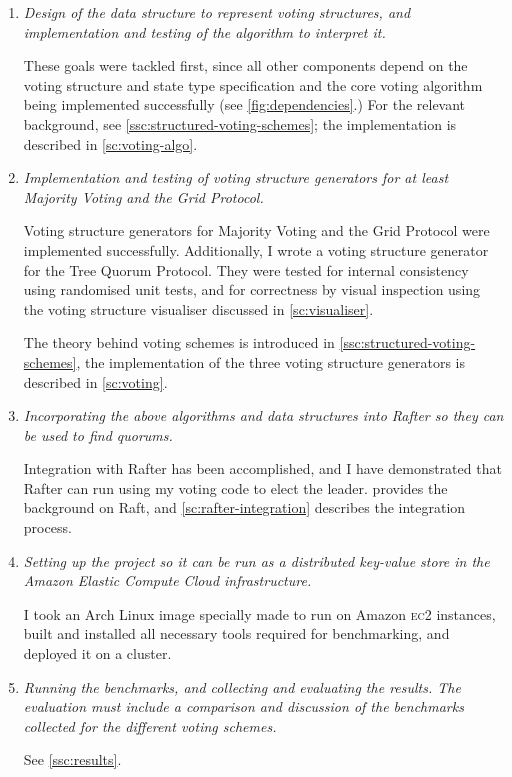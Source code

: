 \documentclass[12pt,chapterprefix=true,toc=bibliography,numbers=noendperiod,
               footnotes=multiple,twoside]{scrreprt}
\newcommand{\ECC}[0]{\textsc{ec}2 }
\begin{document}
\begin{enumerate}
    \item \emph{Design of the data structure to represent voting structures, and implementation and testing of the algorithm to interpret it.}

        These goals were tackled first, since all other components depend on the voting structure and state type specification and the core voting algorithm being implemented successfully (see \cref{fig:dependencies}.) For the relevant background, see \cref{ssc:structured-voting-schemes}; the implementation is described in \cref{sc:voting-algo}.
    \item \emph{Implementation and testing of voting structure generators for at least Majority Voting and the Grid Protocol.}

        Voting structure generators for Majority Voting and the Grid Protocol were implemented successfully. Additionally, I wrote a voting structure generator for the Tree Quorum Protocol. They were tested for internal consistency using randomised unit tests, and for correctness by visual inspection using the voting structure visualiser discussed in \cref{sc:visualiser}.

        The theory behind voting schemes is introduced in \cref{ssc:structured-voting-schemes}, the implementation of the three voting structure generators is described in \cref{sc:voting}.
    \item \emph{Incorporating the above algorithms and data structures into Rafter so they can be used to find quorums.}

        Integration with Rafter has been accomplished, and I have demonstrated that Rafter can run using my voting code to elect the leader.  provides the background on Raft, and \cref{sc:rafter-integration} describes the integration process.
    \item \emph{Setting up the project so it can be run as a distributed key-value store in the Amazon Elastic Compute Cloud infrastructure.}

        I took an Arch Linux image specially made to run on Amazon \ECC{} instances, built and installed all necessary tools required for benchmarking, and deployed it on a cluster.
    \item \emph{Running the benchmarks, and collecting and evaluating the results. The evaluation must include a comparison and discussion of the benchmarks collected for the different voting schemes.}

        See \cref{ssc:results}.
\end{enumerate}
\end{document}

